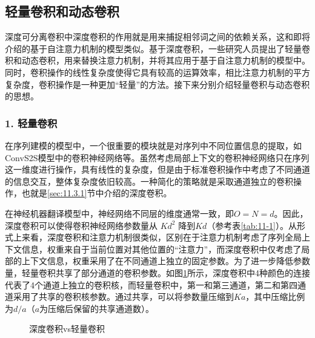 
\subsection{轻量卷积和动态卷积}

\parinterval 深度可分离卷积中深度卷积的作用就是用来捕捉相邻词之间的依赖关系，这和{\chaptertwelve}即将介绍的基于自注意力机制的模型类似。基于深度卷积，一些研究人员提出了轻量卷积和动态卷积，用来替换注意力机制，并将其应用于基于自注意力机制的模型中。同时，卷积操作的线性复杂度使得它具有较高的运算效率，相比注意力机制的平方复杂度，卷积操作是一种更加“轻量”的方法。接下来分别介绍轻量卷积与动态卷积的思想。

\subsubsection{1. 轻量卷积}

\parinterval 在序列建模的模型中，一个很重要的模块就是对序列中不同位置信息的提取，如ConvS2S模型中的卷积神经网络等。虽然考虑局部上下文的卷积神经网络只在序列这一维度进行操作，具有线性的复杂度，但是由于标准卷积操作中考虑了不同通道的信息交互，整体复杂度依旧较高。一种简化的策略就是采取通道独立的卷积操作，也就是\ref{sec:11.3.1}节中介绍的深度卷积。

\parinterval 在神经机器翻译模型中，神经网络不同层的维度通常一致，即$O=N=d$。因此，深度卷积可以使得卷积神经网络参数量从 $Kd^2$ 降到$Kd$（参考表\ref{tab:11-1}）。从形式上来看，深度卷积和注意力机制很类似，区别在于注意力机制考虑了序列全局上下文信息，权重来自于当前位置对其他位置的“注意力”，而深度卷积中仅考虑了局部的上下文信息，权重采用了在不同通道上独立的固定参数。为了进一步降低参数量，轻量卷积共享了部分通道的卷积参数。如图\ref{fig:11-18}所示，深度卷积中4种颜色的连接代表了4个通道上独立的卷积核，而轻量卷积中，第一和第三通道，第二和第四通道采用了共享的卷积核参数。通过共享，可以将参数量压缩到$Ka$，其中压缩比例为$d/a$（$a$为压缩后保留的共享通道数）。

\begin{figure}[htp]
\centering

\caption{深度卷积vs轻量卷积}
\label{fig:11-18}
\end{figure}


